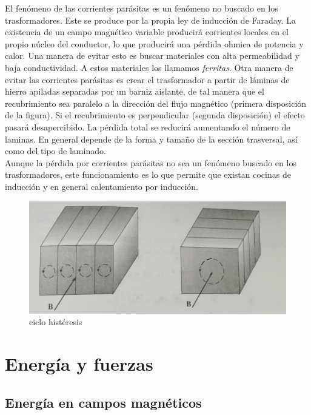 \documentclass[12pt,a4paper]{article}
\begin{document}
El fenómeno de las corrientes parásitas es un fenómeno no buscado en los trasformadores. Este se produce por la propia ley de inducción de Faraday. La existencia de un campo magnético variable producirá corrientes locales en el propio núcleo del conductor, lo que producirá una pérdida ohmica de potencia y calor. Una manera de evitar esto es buscar materiales con alta permeabilidad y baja conductividad. A estos materiales los llamamos \textit{ferritas}. Otra manera de evitar las corrientes parásitas es crear el trasformador a partir de láminas de hierro apiladas separadas por un barniz aislante, de tal manera que el recubrimiento sea paralelo a la dirección del flujo magnético (primera disposición de la figura). Si el recubrimiento es perpendicular (segunda disposición) el efecto pasará desapercibido. La pérdida total se reducirá aumentando el número de laminas. En general depende de la forma y tamaño de la sección trasversal, así como del tipo de laminado. \\

Aunque la pérdida por corrientes parásitas no sea un fenómeno buscado en los trasformadores, este funcionamiento es lo que permite que existan cocinas de inducción y en general calentamiento por inducción. \\

\begin{figure}[h!]
    \centering
    \includegraphics[scale=0.5]{laminacion.png}
    \caption{ciclo histéresis}
\end{figure}




\newpage

\section{Energía y fuerzas}

\subsection{Energía en campos magnéticos}
\end{document}

